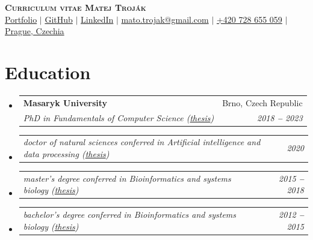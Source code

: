 \documentclass[letterpaper,11pt]{article}
\makeatletter
\newcommand{\resumeSubheading}[4]{
  \vspace{-2pt}\item
    \begin{tabular*}{0.97\textwidth}[t]{l@{\extracolsep{\fill}}r}
      \textbf{#1} & #2 \\
      \textit{\small#3} & \textit{\small #4} \\
    \end{tabular*}\vspace{-7pt}
}
\newcommand{\resumeSubSubheading}[2]{
    \vspace{-2pt}\item
    \begin{tabular*}{0.97\textwidth}{l@{\extracolsep{\fill}}r}
      \textit{\small#1} & \textit{\small #2} \\
    \end{tabular*}\vspace{-7pt}
}
\newcommand{\resumeSubHeadingListStart}{\begin{itemize}[leftmargin=0.15in, label={}]}
\newcommand{\resumeSubHeadingListEnd}{\end{itemize}}
\makeatother
\begin{document}

\begin{center}
  \textbf{\Huge \scshape \hspace*{20pt} Curriculum vitae \hfill \LARGE Matej Troják \hspace*{20pt}} \\ \vspace{3pt}
  \small
  \faGlobe \hspace{.5pt} \href{https://xtrojak.github.io}{Portfolio}
  $|$
  \faGithub \hspace{.5pt} \href{https://github.com/xtrojak}{GitHub}
  $|$
  \faLinkedinSquare \hspace{.5pt} \href{https://linkedin.com/in/matej-troj%C3%A1k-3b1229179}{LinkedIn}
  $|$
  \faEnvelopeO \hspace{.5pt} \href{mailto:mato.trojak@gmail.com}{mato.trojak@gmail.com}
  $|$
  \faMobile \hspace{.5pt} \href{tel:+420728655059}{+420 728 655 059}
  $|$
  \faMapMarker \hspace{.5pt} \href{https://maps.app.goo.gl/5JjzZSVMfNeiNpms6}{Prague, Czechia}
\end{center}



\section{Education}
  \vspace{3pt}
  \resumeSubHeadingListStart

  \resumeSubheading
  {Masaryk University
  }{Brno, Czech Republic}
  {PhD in Fundamentals of Computer Science (\href{https://is.muni.cz/th/m3qym/?lang=en}{thesis})}{2018 \textbf{--} 2023}

  \resumeSubSubheading{doctor of natural sciences conferred in Artificial intelligence and data processing (\href{https://is.muni.cz/auth/th/lc8hj/?lang=en}{thesis})}{2020}

  \resumeSubSubheading{master's degree conferred in Bioinformatics and systems biology (\href{https://is.muni.cz/th/lgs7n/?lang=en;setlang=en}{thesis})}{2015 \textbf{--} 2018}

  \resumeSubSubheading{bachelor's degree conferred in Bioinformatics and systems biology (\href{https://is.muni.cz/th/nhf6y/?lang=en;setlang=en}{thesis})}{2012 \textbf{--} 2015}

  
  \resumeSubHeadingListEnd
\end{document}
